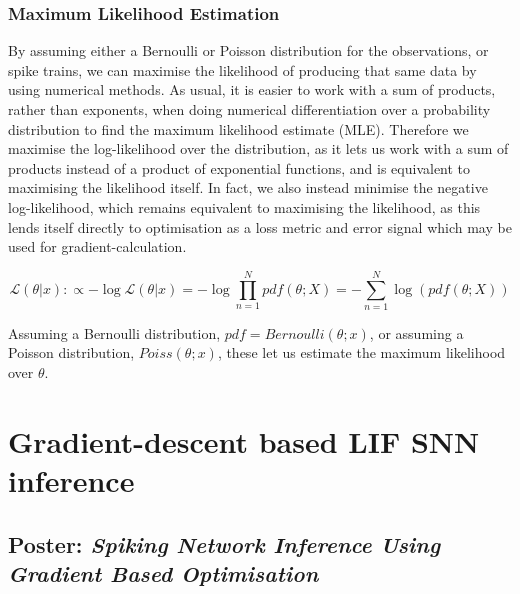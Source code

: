 \documentclass[mphil,deptreport,ianc]{infthesis} %
\begin{document}


\subsection{Maximum Likelihood Estimation}

By assuming either a Bernoulli or Poisson distribution for the observations, or spike trains, we can maximise the likelihood of producing that same data by using numerical methods.
As usual, it is easier to work with a sum of products, rather than exponents, when doing numerical differentiation over a probability distribution to find the maximum likelihood estimate (MLE).
Therefore we maximise the log-likelihood over the distribution, as it lets us work with a sum of products instead of a product of exponential functions, and is equivalent to maximising the likelihood itself.
In fact, we also instead minimise the negative log-likelihood, which remains equivalent to maximising the likelihood, as this lends itself directly to optimisation as a loss metric and error signal which may be used for gradient-calculation.

\begin{equation}
    \mathcal{L}(\theta | x) :\propto - \log \mathcal{L}(\theta | x) = - \log \prod_{n=1}^N pdf(\theta; X) = - \sum_{n=1}^N \log (pdf(\theta; X))
\end{equation}

Assuming a Bernoulli distribution, $pdf=Bernoulli(\theta; x)$, or assuming a Poisson distribution, $Poiss(\theta; x)$, these let us estimate the maximum likelihood over $\theta$.


\chapter{Gradient-descent based LIF SNN inference}\label{chpt:LIF}
\section{Poster: \textit{Spiking Network Inference Using Gradient Based Optimisation}}

\end{document}
